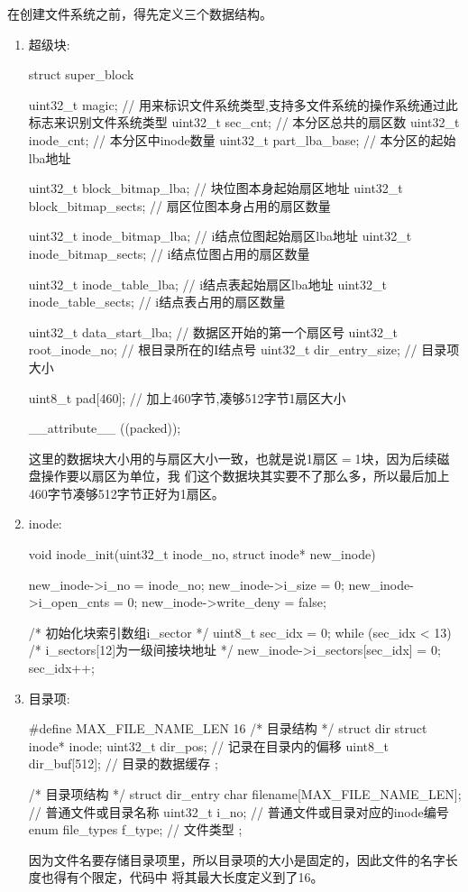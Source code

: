 在创建文件系统之前，得先定义三个数据结构。
\begin{enumerate}
\item 超级块:
\begin{ccode}
struct super_block {
   uint32_t magic;		    // 用来标识文件系统类型,支持多文件系统的操作系统通过此标志来识别文件系统类型
   uint32_t sec_cnt;		    // 本分区总共的扇区数
   uint32_t inode_cnt;		    // 本分区中inode数量
   uint32_t part_lba_base;	    // 本分区的起始lba地址

   uint32_t block_bitmap_lba;	    // 块位图本身起始扇区地址
   uint32_t block_bitmap_sects;     // 扇区位图本身占用的扇区数量

   uint32_t inode_bitmap_lba;	    // i结点位图起始扇区lba地址
   uint32_t inode_bitmap_sects;	    // i结点位图占用的扇区数量

   uint32_t inode_table_lba;	    // i结点表起始扇区lba地址
   uint32_t inode_table_sects;	    // i结点表占用的扇区数量

   uint32_t data_start_lba;	    // 数据区开始的第一个扇区号
   uint32_t root_inode_no;	    // 根目录所在的I结点号
   uint32_t dir_entry_size;	    // 目录项大小

   uint8_t  pad[460];		    // 加上460字节,凑够512字节1扇区大小
} __attribute__ ((packed));
\end{ccode}
这里的数据块大小用的与扇区大小一致，也就是说1扇区$=$1块，因为后续磁盘操作要以扇区为单位，我
们这个数据块其实要不了那么多，所以最后加上460字节凑够512字节正好为1扇区。
\item inode:
\begin{ccode}
void inode_init(uint32_t inode_no, struct inode* new_inode) {
   new_inode->i_no = inode_no;
   new_inode->i_size = 0;
   new_inode->i_open_cnts = 0;
   new_inode->write_deny = false;

   /* 初始化块索引数组i_sector */
   uint8_t sec_idx = 0;
   while (sec_idx < 13) {
   /* i_sectors[12]为一级间接块地址 */
      new_inode->i_sectors[sec_idx] = 0;
      sec_idx++;
   }
}
\end{ccode}
  
\item 目录项:
\begin{ccode}
#define MAX_FILE_NAME_LEN  16
/* 目录结构 */
struct dir {
   struct inode* inode;   
   uint32_t dir_pos;	  // 记录在目录内的偏移
   uint8_t dir_buf[512];  // 目录的数据缓存
};

/* 目录项结构 */
struct dir_entry {
   char filename[MAX_FILE_NAME_LEN];  // 普通文件或目录名称
   uint32_t i_no;		      // 普通文件或目录对应的inode编号
   enum file_types f_type;	      // 文件类型
};
\end{ccode}
因为文件名要存储目录项里，所以目录项的大小是固定的，因此文件的名字长度也得有个限定，代码中
将其最大长度定义到了16。
\end{enumerate}
